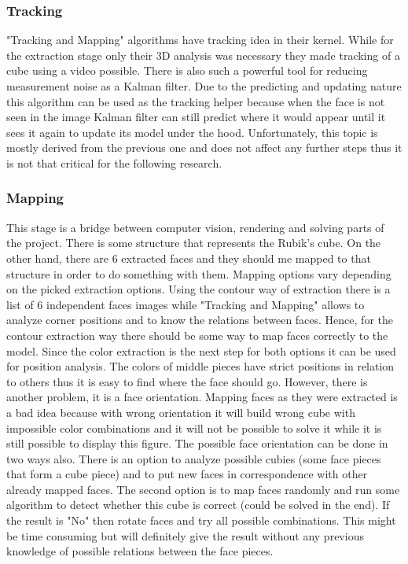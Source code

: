 \documentclass[../../main.tex]{subfiles}
\begin{document}
\subsubsection*{Tracking}

"Tracking and Mapping" algorithms have tracking idea in their kernel. While for the extraction stage only their 3D analysis was necessary they made tracking of a cube using a video possible. There is also such a powerful tool for reducing measurement noise as a Kalman filter. Due to the predicting and updating nature this algorithm can be used as the tracking helper because when the face is not seen in the image Kalman filter can still predict where it would appear until it sees it again to update its model under the hood. Unfortunately, this topic is mostly derived from the previous one and does not affect any further steps thus it is not that critical for the following research.

\subsubsection*{Mapping}

This stage is a bridge between computer vision, rendering and solving parts of the project. There is some structure that represents the Rubik's cube. On the other hand, there are 6 extracted faces and they should me mapped to that structure in order to do something with them. Mapping options vary depending on the picked extraction options. Using the contour way of extraction there is a list of 6 independent faces images while "Tracking and Mapping" allows to analyze corner positions and to know the relations between faces. Hence, for the contour extraction way there should be some way to map faces correctly to the model. Since the color extraction is the next step for both options it can be used for position analysis. The colors of middle pieces have strict positions in relation to others thus it is easy to find where the face should go. However, there is another problem, it is a face orientation. Mapping faces as they were extracted is a bad idea because with wrong orientation it will build wrong cube with impossible color combinations and it will not be possible to solve it while it is still possible to display this figure. The possible face orientation can be done in two ways also. There is an option to analyze possible cubies (some face pieces that form a cube piece) and to put new faces in correspondence with other already mapped faces. The second option is to map faces randomly and run some algorithm to detect whether this cube is correct (could be solved in the end). If the result is "No" then rotate faces and try all possible combinations. This might be time consuming but will definitely give the result without any previous knowledge of possible relations between the face pieces.
\end{document}
